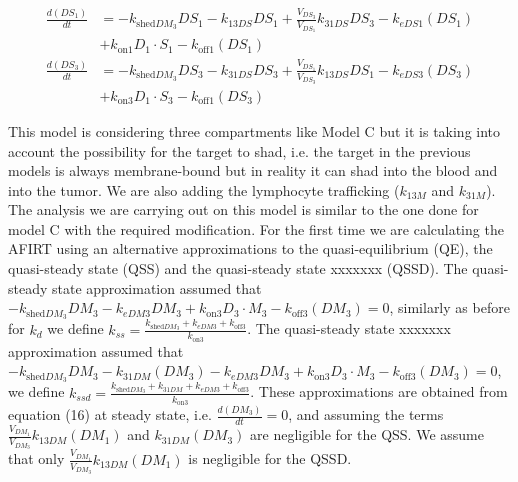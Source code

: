 \begin{align}
\frac{d(DS_1)}{dt} &=-k_{\text{shed}DM_3}DS_1  - k_{13DS}DS_1 + \frac{V_{DS_3}}{V_{DS_1}}k_{31DS}DS_3 - k_{eDS1}(DS_1)  \nonumber\\ &+ k_{\text{on}1}D_1 \cdot S_1 - k_{\text{off}1}(DS_1)  \\
\frac{d(DS_3)}{dt} &=-k_{\text{shed}DM_3}DS_3  - k_{31DS}DS_3 + \frac{V_{DS_1}}{V_{DS_3}}k_{13DS}DS_1 - k_{eDS3}(DS_3)  \nonumber\\ &+ k_{\text{on}3}D_1 \cdot S_3 - k_{\text{off}1}(DS_3)  
\end{align}

This model is considering three compartments like Model C but it is taking into account the possibility for the target to shad, i.e. the target in the previous models is always membrane-bound but in reality it can shad into the blood and into the tumor. We are also adding the lymphocyte trafficking ($k_{13M}$ and $k_{31M}$).
The analysis we are carrying out on this model is similar to the one done for model C with the required modification. For the first time we are calculating the AFIRT using an alternative approximations to the quasi-equilibrium (QE), the quasi-steady state (QSS) and the quasi-steady state xxxxxxx (QSSD). The quasi-steady state approximation assumed that $-k_{\text{shed}DM_3}DM_3 - k_{eDM3}DM_3+k_{\text{on}3}D_3 \cdot M_3 - k_{\text{off}3}(DM_3) = 0 $, similarly as before for $k_d$ we define $k_{ss}=\frac{k_{\text{shed}DM_3} + k_{eDM3}+ k_{\text{off}3}}{k_{\text{on}3}}$. 
The quasi-steady state xxxxxxx approximation assumed that $-k_{\text{shed}DM_3}DM_3-k_{31DM}(DM_3) - k_{eDM3}DM_3+k_{\text{on}3}D_3 \cdot M_3 - k_{\text{off}3}(DM_3) = 0 $, we define $k_{ssd}=\frac{k_{\text{shed}DM_3} +k_{31DM}+ k_{eDM3}+ k_{\text{off}3}}{k_{\text{on}3}}$. 
These approximations are obtained from equation (16) at steady state, i.e. $\frac{d(DM_3)}{dt}=0$, and assuming the terms $ \frac{V_{DM_1}}{V_{DM_3}}k_{13DM}(DM_1)$ and $ k_{31DM}(DM_3) $ are negligible for the QSS. We assume that only $\frac{V_{DM_1}}{V_{DM_3}}k_{13DM}(DM_1)$ is negligible for the QSSD. 

